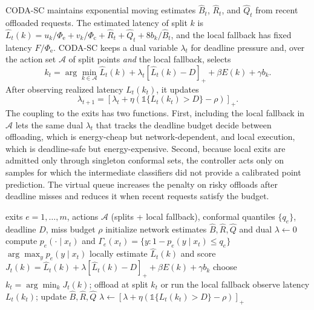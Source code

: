 \documentclass[11pt]{article}
\begin{document}
CODA-SC maintains exponential moving estimates $\widehat{B}_t$,
$\widehat{R}_t$, and $\widehat{Q}_t$ from recent offloaded requests. The
estimated latency of split $k$ is
$\widehat{L}_t(k) = u_k/\Phi_{\mathrm{e}} + v_k/\Phi_{\mathrm{c}} + \widehat{R}_t
+ \widehat{Q}_t + 8b_k/\widehat{B}_t$, and the local fallback has fixed latency
$F/\Phi_{\mathrm{e}}$. CODA-SC keeps a dual variable $\lambda_t$ for deadline
pressure and, over the action set $\mathcal{A}$ of split points \emph{and} the
local fallback, selects
\begin{equation}
    k_t = \arg\min_{k\in\mathcal{A}} \widehat{L}_t(k)
          + \lambda_t [\widehat{L}_t(k)-D]_+
          + \beta E(k) + \gamma b_k.
    \label{eq:controller}
\end{equation}
After observing realized latency $L_t(k_t)$, it updates
\begin{equation}
    \lambda_{t+1} = [\lambda_t + \eta(\mathbb{1}\{L_t(k_t)>D\}-\rho)]_+.
    \label{eq:dual}
\end{equation}
The coupling to the exits has two functions. First, including the local fallback
in $\mathcal{A}$ lets the same dual $\lambda_t$ that tracks the deadline budget
decide between offloading, which is energy-cheap but network-dependent, and local
execution, which is deadline-safe but energy-expensive. Second, because local
exits are admitted only through singleton conformal sets, the controller acts
only on samples for which the intermediate classifiers did not provide a
calibrated point prediction. The virtual queue increases the penalty on risky
offloads after deadline misses and reduces it when recent requests satisfy the
budget.

\begin{algorithm}[t]
\caption{CODA-SC Inference}
\label{alg:coda}
\begin{algorithmic}[1]
\Require exits $e=1,\ldots,m$, actions $\mathcal{A}$ (splits + local fallback),
conformal quantiles $\{q_e\}$, deadline $D$, miss budget $\rho$
\State initialize network estimates $\widehat{B},\widehat{R},\widehat{Q}$ and dual $\lambda\gets0$
        \State compute $p_e(\cdot\mid x_t)$ and $\Gamma_e(x_t)=\{y:1-p_e(y\mid x_t)\le q_e\}$
            \State \Return $\arg\max_y p_e(y\mid x_t)$ locally
        \EndIf
    \EndFor
        \State estimate $\widehat{L}_t(k)$ and score $J_t(k)=\widehat{L}_t(k)+\lambda[\widehat{L}_t(k)-D]_+ + \beta E(k)+\gamma b_k$
    \EndFor
    \State choose $k_t=\arg\min_k J_t(k)$; offload at split $k_t$ or run the local fallback
    \State observe latency $L_t(k_t)$; update $\widehat{B},\widehat{R},\widehat{Q}$
    \State $\lambda\gets[\lambda+\eta(\mathbb{1}\{L_t(k_t)>D\}-\rho)]_+$
\EndFor
\end{algorithmic}
\end{algorithm}
\end{document}
